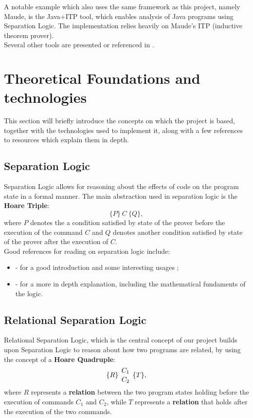 \documentclass[12pt,a4paper]{article}
\begin{document}
A notable example which also uses the same framework as this project, namely Maude, is the Java+ITP\cite{JAVAITP} tool, which enables analysis of Java programs using Separation Logic. The implementation relies heavily on Maude's ITP (inductive theorem prover).
\\

Several other tools are presented or referenced in \cite{primer}.

\section{Theoretical Foundations and technologies}
This section will briefly introduce the concepts on which the project is based, together with the technologies used to implement it, along with a few references to resources which explain them in depth.
\subsection{Separation Logic}
Separation Logic allows for reasoning about the effects of code on the program state in a formal manner. The main abstraction used in separation logic is the \textbf{Hoare Triple}:
\[ \{P\}\  C\  \{Q\} ,\]
where \(P\) denotes the a condition satisfied by state of the prover before the execution of the command \(C\) and \(Q\) denotes another condition satisfied by state of the prover after the execution of \(C\).
\\

Good references for reading on separation logic include: 
\begin{itemize}
	\item \cite{primer} - for a good introduction and some interesting usages ;
	\item \cite{SeparationLogic} - for a more in depth explanation, including the mathematical fundaments of the logic.
\end{itemize} 
\subsection{Relational Separation Logic}
Relational Separation Logic, which is the central concept of our project builds upon Separation Logic to reason about how two programs are related, by using the concept of a \textbf{Hoare Quadruple}:
\[\{R\}\ {C_1 \atop C_2}\   \{T\},\]
where \(R\) represents a \textbf{relation} between the two program states holding before the execution of commands \(C_1\) and \(C_2\), while \(T\) represents a \textbf{relation} that holds after the execution of the two commands. 
\\
\end{document}
